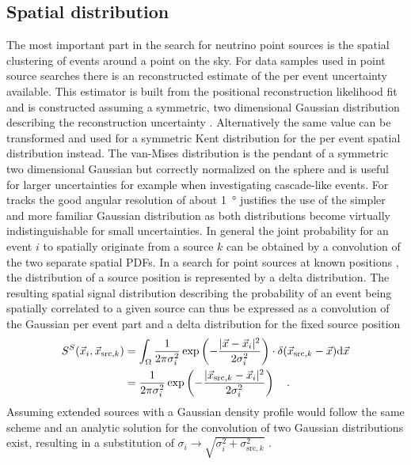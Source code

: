 \subsection{Spatial distribution}
The most important part in the search for neutrino point sources is the spatial clustering of events around a point on the sky.
For data samples used in point source searches there is an reconstructed estimate of the per event uncertainty available.
This estimator is built from the positional reconstruction likelihood fit and is constructed assuming a symmetric, two dimensional Gaussian distribution describing the reconstruction uncertainty .
Alternatively the same value can be transformed and used for a symmetric Kent distribution  for the per event spatial distribution instead.
The van-Mises distribution is the pendant of a symmetric two dimensional Gaussian but correctly normalized on the sphere and is useful for larger uncertainties for example when investigating cascade-like events.
For tracks the good angular resolution of about \SI{1}{\degree} justifies the use of the simpler and more familiar Gaussian distribution as both distributions become virtually indistinguishable for small uncertainties.
In general the joint probability for an event $i$ to spatially originate from a source $k$ can be obtained by a convolution of the two separate spatial PDFs.
In a search for point sources at known positions , the distribution of a source position is represented by a delta distribution.
The resulting spatial signal distribution describing the probability of an event being spatially correlated to a given source can thus be expressed as a convolution of the Gaussian per event part and a delta distribution for the fixed source position
\begin{equation}
  \begin{aligned}
    S^S(\vec{x}_i, \vec{x}_{\mathrm{src},k}) &=
      \int_\Omega \frac{1}{2\pi \sigma_i^2}
      \exp\left(-\frac{|\vec{x}-\vec{x}_i|^2}{2\sigma_i^2}\right) \cdot
      \delta(\vec{x}_{\mathrm{src},k} - \vec{x}) \mathrm{d}\vec{x} \\
      &= \frac{1}{2\pi \sigma_i^2}
         \exp\left(-\frac{|\vec{x}_{\mathrm{src},k}-
                          \vec{x}_i|^2}{2\sigma_i^2}\right)
      \quad\text{.}
  \end{aligned}
\end{equation}
Assuming extended sources with a Gaussian density profile would follow the same scheme and an analytic solution for the convolution of two Gaussian distributions exist, resulting in a substitution of $\sigma_i \rightarrow \sqrt{\sigma_i^2 + \sigma_{\text{src},k}^2}$ .

